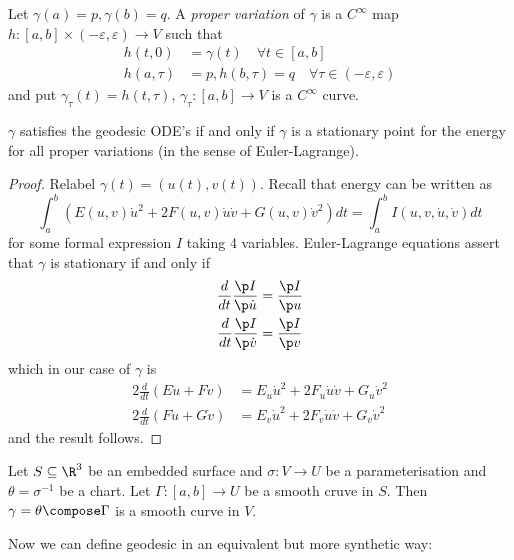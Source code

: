 \documentclass[a4paper]{article}
\theoremstyle{definition}
\begin{document}
\begin{definition}
  Let \(\gamma(a) = p, \gamma(b) = q\). A \emph{proper variation} of \(\gamma\) is a \(C^\infty\) map \(h: [a, b] \times (-\varepsilon, \varepsilon) \to V\) such that
  \begin{align*}
    h(t, 0) &= \gamma(t) \quad \forall t \in [a, b] \\
    h(a, \tau) &= p, h(b, \tau) = q \quad \forall \tau \in (-\varepsilon, \varepsilon)
  \end{align*}
  and put \(\gamma_\tau(t) = h(t, \tau)\), \(\gamma_\tau: [a, b] \to V\) is a \(C^\infty\) curve.
\end{definition}

\begin{proposition}
  \(\gamma\) satisfies the geodesic ODE's if and only if \(\gamma\) is a stationary point for the energy for all proper variations (in the sense of Euler-Lagrange).
\end{proposition}

\begin{proof}
  Relabel \(\gamma(t) = (u(t), v(t))\). Recall that energy can be written as
  \[
    \int_a^b (E(u, v) \dot u^2 + 2F(u, v) \dot u \dot v + G(u, v) \dot v^2) dt
    = \int_a^b I(u, v, \dot u, \dot v) dt
  \]
  for some formal expression \(I\) taking 4 variables. Euler-Lagrange equations assert that \(\gamma\) is stationary if and only if
  \begin{align*}
    \frac{d}{dt} \frac{\p I}{\p \dot u} &= \frac{\p I}{\p u} \\
    \frac{d}{dt} \frac{\p I}{\p \dot v} &= \frac{\p I}{\p v}
  \end{align*}
  which in our case of \(\gamma\) is
  \begin{align*}
    2 \frac{d}{dt} (E \dot u + F \dot v) &= E_u \dot u^2 + 2F_u \dot u \dot v + G_u \dot v^2 \\ 
    2 \frac{d}{dt} (F \dot u + G \dot v) &= E_v \dot u^2 + 2F_v \dot u \dot v + G_v \dot v^2
  \end{align*}
  and the result follows.
\end{proof}

Let \(S \subseteq \R^3\) be an embedded surface and \(\sigma: V \to U\) be a parameterisation and \(\theta = \sigma^{-1}\) be a chart. Let \(\Gamma: [a, b] \to U\) be a smooth cruve in \(S\). Then \(\gamma = \theta \compose \Gamma\) is a smooth curve in \(V\).

Now we can define geodesic in an equivalent but more synthetic way:
\end{document}

